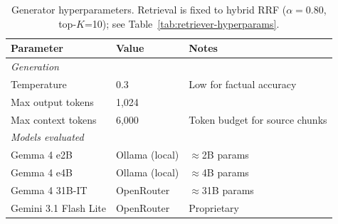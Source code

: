 \documentclass[11pt,a4paper]{article}
\begin{document}
\begin{table}[h]
\caption{Generator hyperparameters. Retrieval is fixed to hybrid RRF ($\alpha=0.80$, top-$K$=10); see Table~\ref{tab:retriever-hyperparams}.}
\label{tab:generator-hyperparams}
\centering
\begin{tabular}{lll}
\toprule
\textbf{Parameter} & \textbf{Value} & \textbf{Notes} \\
\midrule
\multicolumn{3}{l}{\textit{Generation}} \\
Temperature & 0.3 & Low for factual accuracy \\
Max output tokens & 1{,}024 & \\
Max context tokens & 6{,}000 & Token budget for source chunks \\
\midrule
\multicolumn{3}{l}{\textit{Models evaluated}} \\
Gemma 4 e2B & Ollama (local) & $\approx$2B params \\
Gemma 4 e4B & Ollama (local) & $\approx$4B params \\
Gemma 4 31B-IT & OpenRouter & $\approx$31B params \\
Gemini 3.1 Flash Lite & OpenRouter & Proprietary \\
\bottomrule
\end{tabular}
\end{table}
\end{document}
